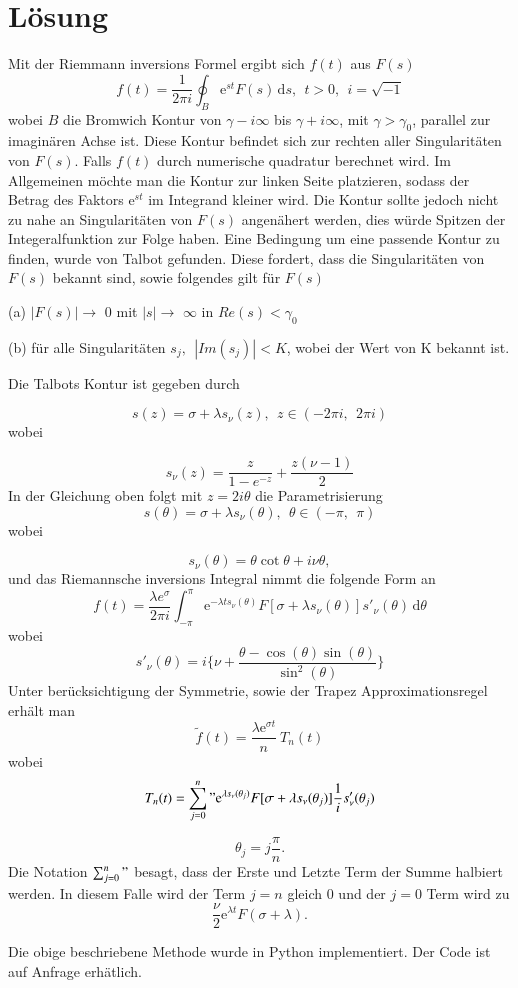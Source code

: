 %
%
%


\section{Lösung}
\label{laplace:section:Methode nach Talbot}
Mit der Riemmann inversions Formel ergibt sich $f(t)$ aus $F(s)$
\[
f(t) = \frac{1}{2\pi i} \oint_{B} \mathrm{e}^{st}F(s)\,\mathrm{d}s,~~t>0,~~i=\sqrt{-1}
\]
wobei $B$ die Bromwich Kontur von $\gamma-i\infty$ bis $\gamma+i\infty$, mit $\gamma>\gamma_{0}$, parallel zur imaginären Achse ist.
Diese Kontur befindet sich zur rechten aller Singularitäten von $F(s)$.
Falls $f(t)$ durch numerische quadratur berechnet wird.
Im Allgemeinen möchte man die Kontur zur linken Seite platzieren, sodass der Betrag des Faktors $\mathrm{e}^{st}$ im Integrand kleiner wird. Die Kontur sollte jedoch nicht zu nahe an Singularitäten von $F(s)$ angenähert werden, dies würde Spitzen der Integeralfunktion zur Folge haben.
Eine Bedingung um eine passende Kontur zu finden, wurde von Talbot gefunden.
Diese fordert, dass die Singularitäten von $F(s)$ bekannt sind, sowie folgendes gilt für $F(s)$

(a) $|F(s)|\rightarrow$ 0 mit $|s|\rightarrow$ $\infty$ in $Re(s)<\gamma_{0}$

(b) für alle Singularitäten $s_{j},~~|Im(s_{j})|<K$, wobei der Wert von K bekannt ist.

Die Talbots Kontur ist gegeben durch

\[
s(z) = \sigma+\lambda s_{\nu}(z),~~ z\in (-2\pi i,~~2\pi i)
\]
wobei

\[
s_{\nu}(z)=\frac{z}{1-e^{-z}}+\frac{z(\nu-1)}{2}
\]
In der Gleichung oben folgt mit $z=2i\theta$ die Parametrisierung
\[
s(\theta) = \sigma+\lambda s_{\nu}(\theta),~~ \theta\in (-\pi ,~~\pi)
\]
wobei

\[
s_{\nu}(\theta)=\theta \cot\theta+i\nu\theta,
\]
und das Riemannsche inversions Integral nimmt die folgende Form an
\[
f(t)=\frac{\lambda e^{\sigma}}{2\pi i}\int_{-\pi}^{\pi} \mathrm{e}^{-\lambda ts_{\nu}(\theta)}F[\sigma + \lambda s_{\nu}(\theta)]s'_{\nu}(\theta)\,\mathrm{d}\theta
\]
wobei
\[
s'_{\nu}(\theta) = i \Biggl\{\nu + \frac{\theta-\cos(\theta)\sin(\theta)}{\sin^{2}(\theta)}  \Biggr\}
\]
Unter berücksichtigung der Symmetrie, sowie der Trapez Approximationsregel erhält man
\[
\tilde{f}(t) = \frac{\lambda\mathrm{e}^{\sigma t}}{n}~T_{n}(t)
\]
wobei 
\[
T_{n}(t)=\sum_{j=0}^n " \mathrm{e}^{\lambda s_{\nu}(\theta_{j})} F[\sigma + \lambda s_{\nu}(\theta_{j})] \frac{1}{i} s'_{\nu}(\theta_{j})
\]

\[
\theta_{j} = j \frac{\pi}{n}.
\]
Die Notation $\sum_{j=0}^n "$ besagt, dass der Erste und Letzte Term der Summe halbiert werden. In diesem Falle wird der Term $j=n$ gleich 0 und der $j=0$ Term wird zu
\[
\frac{\nu}{2}\mathrm{e}^{\lambda t}F(\sigma + \lambda).
\]

Die obige beschriebene Methode wurde in Python implementiert.
Der Code ist auf Anfrage erhätlich.

